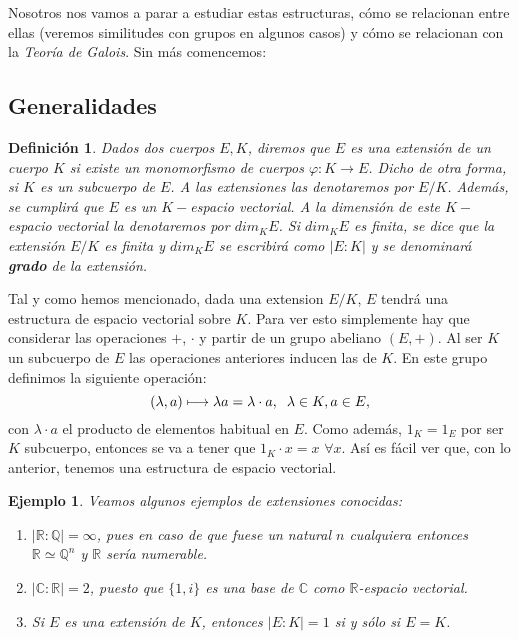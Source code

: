 \documentclass[12pt]{article}
\newtheorem{definition}[theorem]{Definición}
\newtheorem{example}{Ejemplo}[theorem]
\begin{document}
Nosotros nos vamos a parar a estudiar estas estructuras, cómo se relacionan entre ellas (veremos similitudes con grupos en algunos casos) y cómo se relacionan con la \textit{Teoría de Galois}. Sin más comencemos:
\subsection{Generalidades}
\begin{definition} Dados dos cuerpos $E,K$, diremos que $E$ es una extensión de un cuerpo $K$ si existe un monomorfismo de cuerpos $\varphi \colon K \longrightarrow E$. Dicho de otra forma, si $K$ es un subcuerpo de $E$. A las extensiones las denotaremos por $E/K$.
Además, se cumplirá que $E$ es un $K-$espacio vectorial. A la dimensión de este $K-$espacio vectorial la denotaremos por $dim_{K}E$. Si $dim_{K}E$ es finita, se dice que la extensión $E/K$ es finita y $dim_{K}E$ se escribirá como $| E : K|$ y se denominará \textbf{grado} de la extensión.
\end{definition}

Tal y como hemos mencionado, dada una extension $E/K$, $E$ tendrá una estructura de espacio vectorial sobre $K$. Para ver esto simplemente hay que considerar las operaciones $+$, $\cdot$ y partir de un grupo abeliano $(E, +)$. Al ser $K$ un subcuerpo de $E$ las operaciones anteriores inducen las de $K$. En este grupo definimos la siguiente operación: $$(\lambda, a) \longmapsto \lambda a = \lambda \cdot a, \hspace{0.2cm} \lambda \in K, a \in E,$$ con $\lambda \cdot a$ el producto de elementos habitual en $E$. Como además, $1_{K} = 1_{E}$ por ser $K$ subcuerpo, entonces se va a tener que $1_{K} \cdot x = x$ $\forall x$. Así es fácil ver que, con lo anterior, tenemos una estructura de espacio vectorial.

\begin{example} Veamos algunos ejemplos de extensiones conocidas: \begin{enumerate}
\item $|\mathbb{R} : \mathbb{Q}| = \infty$, pues en caso de que fuese un natural $n$ cualquiera entonces $\mathbb{R} \simeq \mathbb{Q}^{n}$ y $\mathbb{R}$ sería numerable.
\item $|\mathbb{C} : \mathbb{R} | = 2$, puesto que $\lbrace 1, i \rbrace$ es una base de $\mathbb{C}$ como $\mathbb{R}$-espacio vectorial.
\item Si $E$ es una extensión de $K$, entonces $|E : K | = 1$ si y sólo si $E = K$.
\end{enumerate}
\end{example}
\end{document}
